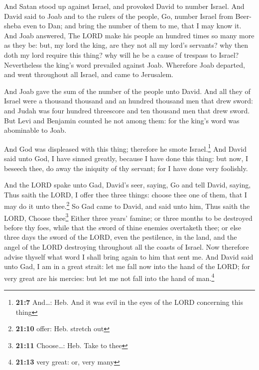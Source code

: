 And Satan stood up against Israel, and provoked David to
number Israel.  And David said to Joab and to the rulers
of the people, Go, number Israel from Beer-sheba even to Dan; and bring
the number of them to me, that I may know it.  And Joab
answered, The LORD make his people an hundred times so many more as they
be: but, my lord the king, are they not all my lord's servants? why then
doth my lord require this thing? why will he be a cause of trespass to
Israel?  Nevertheless the king's word prevailed against
Joab. Wherefore Joab departed, and went throughout all Israel, and came
to Jerusalem.

 And Joab gave the sum of the number of the people unto
David. And all they of Israel were a thousand thousand and an hundred
thousand men that drew sword: and Judah was four hundred threescore and
ten thousand men that drew sword.  But Levi and Benjamin
counted he not among them: for the king's word was abominable to Joab.

 And God was displeased with this thing; therefore he
smote Israel.\footnote{\textbf{21:7} And\ldots: Heb. And it was evil in
  the eyes of the LORD concerning this thing}  And David
said unto God, I have sinned greatly, because I have done this thing:
but now, I beseech thee, do away the iniquity of thy servant; for I have
done very foolishly.

 And the LORD spake unto Gad, David's seer, saying,
 Go and tell David, saying, Thus saith the LORD, I offer
thee three things: choose thee one of them, that I may do it unto
thee.\footnote{\textbf{21:10} offer: Heb. stretch out} 
So Gad came to David, and said unto him, Thus saith the LORD, Choose
thee\footnote{\textbf{21:11} Choose\ldots: Heb. Take to thee}
 Either three years' famine; or three months to be
destroyed before thy foes, while that the sword of thine enemies
overtaketh thee; or else three days the sword of the LORD, even the
pestilence, in the land, and the angel of the LORD destroying throughout
all the coasts of Israel. Now therefore advise thyself what word I shall
bring again to him that sent me.  And David said unto
Gad, I am in a great strait: let me fall now into the hand of the LORD;
for very great are his mercies: but let me not fall into the hand of
man.\footnote{\textbf{21:13} very great: or, very many}

